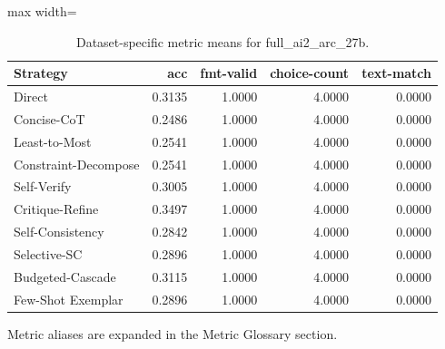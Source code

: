 \documentclass[10pt,twocolumn]{article}
\begin{document}
\begin{table}[t]
\centering
\caption{Dataset-specific metric means for full\_ai2\_arc\_27b.}
\label{tab:full_ai2_arc_27b_dataset}
\begin{adjustbox}{max width=\textwidth}
\begin{tabular}{lrrrr}
\toprule
Strategy & acc & fmt-valid & choice-count & text-match \\
\midrule
Direct & 0.3135 & 1.0000 & 4.0000 & 0.0000 \\
Concise-CoT & 0.2486 & 1.0000 & 4.0000 & 0.0000 \\
Least-to-Most & 0.2541 & 1.0000 & 4.0000 & 0.0000 \\
Constraint-Decompose & 0.2541 & 1.0000 & 4.0000 & 0.0000 \\
Self-Verify & 0.3005 & 1.0000 & 4.0000 & 0.0000 \\
Critique-Refine & 0.3497 & 1.0000 & 4.0000 & 0.0000 \\
Self-Consistency & 0.2842 & 1.0000 & 4.0000 & 0.0000 \\
Selective-SC & 0.2896 & 1.0000 & 4.0000 & 0.0000 \\
Budgeted-Cascade & 0.3115 & 1.0000 & 4.0000 & 0.0000 \\
Few-Shot Exemplar & 0.2896 & 1.0000 & 4.0000 & 0.0000 \\
\bottomrule
\end{tabular}
\end{adjustbox}
\vspace{2pt}\parbox{0.98\textwidth}{\footnotesize Metric aliases are expanded in the Metric Glossary section.}
\end{table}
\end{document}

